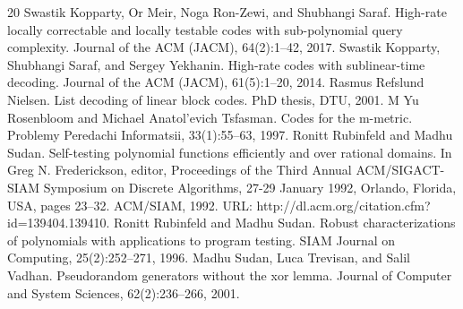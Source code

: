 \begin{thebibliography}{20}
 Swastik Kopparty, Or Meir, Noga Ron-Zewi, and Shubhangi Saraf. High-rate locally correctable and locally testable codes with sub-polynomial query complexity. Journal of the ACM (JACM), 64(2):1–42, 2017.
 Swastik Kopparty, Shubhangi Saraf, and Sergey Yekhanin. High-rate codes with sublinear-time decoding. Journal of the ACM (JACM), 61(5):1–20, 2014.
 Rasmus Refslund Nielsen. List decoding of linear block codes. PhD thesis, DTU, 2001.
 M Yu Rosenbloom and Michael Anatol’evich Tsfasman. Codes for the m-metric. Problemy Peredachi Informatsii, 33(1):55–63, 1997.
 Ronitt Rubinfeld and Madhu Sudan. Self-testing polynomial functions efficiently and over rational domains. In Greg N. Frederickson, editor, Proceedings of the Third Annual ACM/SIGACT-SIAM Symposium on Discrete Algorithms, 27-29 January 1992, Orlando, Florida, USA, pages 23–32. ACM/SIAM, 1992. URL: http://dl.acm.org/citation.cfm?id=139404.139410.
 Ronitt Rubinfeld and Madhu Sudan. Robust characterizations of polynomials with applications to program testing. SIAM Journal on Computing, 25(2):252–271, 1996.
 Madhu Sudan, Luca Trevisan, and Salil Vadhan. Pseudorandom generators without the xor lemma. Journal of Computer and System Sciences, 62(2):236–266, 2001.
\end{thebibliography}
